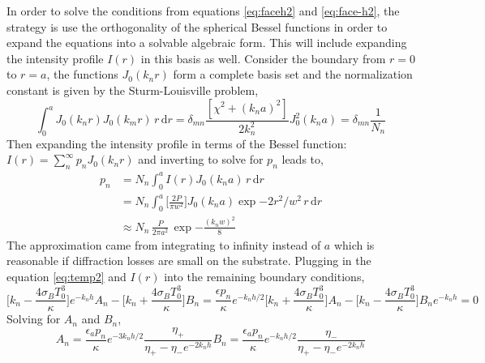 	In order to solve the conditions from equations \ref{eq:faceh2} and \ref{eq:face-h2}, the strategy is use the orthogonality of the spherical Bessel functions in order to expand the equations into a solvable algebraic form.  This will include expanding the intensity profile $I(r)$ in this basis as well.  Consider the boundary from $r=0$ to $r=a$, the functions $J_0(k_n r)$ form a complete basis set and the normalization constant is given by the Sturm-Louisville problem,
	\begin{equation}
	\int_{0}^{a} J_0(k_n r) J_0(k_m r) \,r \, \text{d}r= \delta_{mn} \frac{[\chi^2 + (k_na)^2]}{2k_n^2} J^2_0(k_na) = \delta_{mn} \frac{1}{N_n}
	\end{equation}
	Then expanding the intensity profile in terms of the Bessel function: $I(r)= \sum_{n}^{\infty} p_n J_0(k_n r)$ and inverting to solve for $p_n$ leads to,
	\begin{equation}
	\begin{aligned}\label{eq:p_n_gauss}
	p_n &= N_n \int_{0}^{a} I(r) J_0(k_n a) \, r \, \text{d}r\\
		&= N_n \int_{0}^{a} \bigg[\frac{2 P}{\pi w^2}\bigg] J_0(k_n a) \exp{-2r^2/w^2} \, r \, \text{d}r\\
		&\approx N_n \, \frac{P}{2\pi a^2} \, \exp{-\frac{(k_n w )^2}{8} } 
	\end{aligned}
	\end{equation}
	The approximation came from integrating to infinity instead of $a$ which is reasonable if diffraction losses are small on the substrate.  Plugging in the equation \ref{eq:temp2} and $I(r)$ into the remaining boundary conditions,
	\begin{subequations}
		\begin{equation}
		\bigg[ k_n - \frac{4\sigma_B T_0^3}{\kappa}\bigg] e^{-k_nh} A _n - \bigg[ k_n + \frac{4\sigma_B T_0^3}{\kappa}\bigg] B_n = \frac{\epsilon p_n  }{\kappa} e^{-k_nh/2}
		\end{equation}
		\begin{equation}
		\bigg[ k_n + \frac{4\sigma_B T_0^3}{\kappa} \bigg] A _n - \bigg[ k_n - \frac{4\sigma_B T_0^3}{\kappa}\bigg] B_n e^{-k_nh} = 0
		\end{equation}
	\end{subequations}
	Solving for $A_n$ and $B_n$,
	\begin{subequations}
		\begin{equation}
			A_n = \frac{\epsilon_a p_n}{\kappa} e^{-3k_n h /2} \frac{\eta_{+}}{\eta_{+} - \eta_{-} e^{-2k_n h} }
		\end{equation}
		\begin{equation}
			B_n = \frac{\epsilon_a p_n}{\kappa} e^{-k_n h /2} \frac{\eta_{-}}{\eta_{+} - \eta_{-} e^{-2k_n h} }
		\end{equation}
	\end{subequations}
